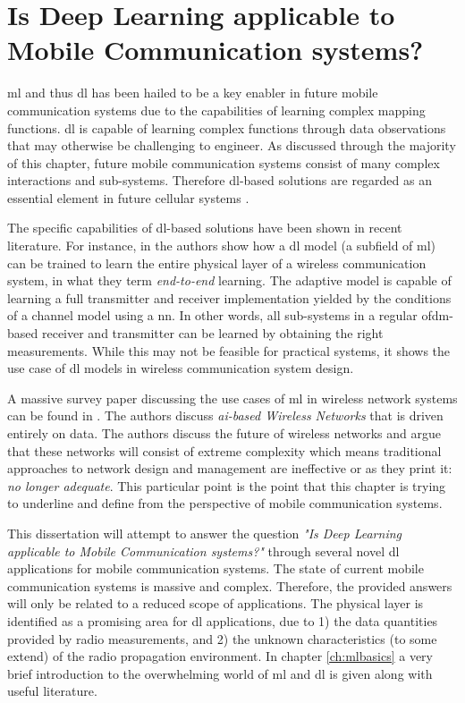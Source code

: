 \section{Is Deep Learning applicable to Mobile Communication systems?}
\acrfull{ml} and thus \acrfull{dl} has been hailed to be a key enabler in future mobile communication systems due to the capabilities of learning complex mapping functions. \gls{dl} is capable of learning complex functions through data observations that may otherwise be challenging to engineer. As discussed through the majority of this chapter, future mobile communication systems consist of many complex interactions and sub-systems. Therefore \gls{dl}-based solutions are regarded as an essential element in future cellular systems \cite{Li2017IntelligentIntelligence, Klaine2017ANetworks}. 
 
The specific capabilities of \gls{dl}-based solutions have been shown in recent literature. For instance, in \cite{OShea2017, Dorner2018, Aoudia2018} the authors show how a \gls{dl} model (a subfield of \gls{ml}) can be trained to learn the entire physical layer of a wireless communication system, in what they term \emph{end-to-end} learning. The adaptive model is capable of learning a full transmitter and receiver implementation yielded by the conditions of a channel model using a \gls{nn}. In other words, all sub-systems in a regular \gls{ofdm}-based receiver and transmitter can be learned by obtaining the right measurements. While this may not be feasible for practical systems, it shows the use case of \gls{dl} models in wireless communication system design.


A massive survey paper discussing the use cases of \gls{ml} in wireless network systems can be found in \cite{Zappone2019}. The authors discuss \emph{\gls{ai}-based Wireless Networks} that is driven entirely on data. The authors discuss the future of wireless networks and argue that these networks will consist of extreme complexity which means traditional approaches to network design and management are ineffective or as they print it: \emph{no longer adequate}. This particular point is the point that this chapter is trying to underline and define from the perspective of mobile communication systems. 


This dissertation will attempt to answer the question \emph{"Is Deep Learning applicable to Mobile Communication systems?"} through several novel \gls{dl} applications for mobile communication systems. The state of current mobile communication systems is massive and complex. Therefore, the provided answers will only be related to a reduced scope of applications. The physical layer is identified as a promising area for \gls{dl} applications, due to 1) the data quantities provided by radio measurements, and 2) the unknown characteristics (to some extend) of the radio propagation environment.  In chapter \ref{ch:mlbasics} a very brief introduction to the overwhelming world of \gls{ml} and \gls{dl} is given along with useful literature. 